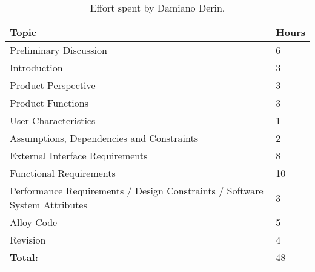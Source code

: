 \begin{table}[H]
    \centering
    \begin{tabular}{| m{} | m{} |}
        \hline
        \textbf{Topic}                                                             & \textbf{Hours} \\
        \hline
        Preliminary Discussion                                                     & 6              \\
        \hline
        Introduction                                                               & 3              \\
        \hline
        Product Perspective                                                        & 3              \\
        \hline
        Product Functions                                                          & 3              \\
        \hline
        User Characteristics                                                       & 1              \\
        \hline
        Assumptions, Dependencies and Constraints                                  & 2              \\
        \hline
        External Interface Requirements                                            & 8              \\
        \hline
        Functional Requirements                                                    & 10             \\
        \hline
        Performance Requirements / Design Constraints / Software System Attributes & 3              \\
        \hline
        Alloy Code                                                                 & 5              \\
        \hline
        Revision                                                                   & 4              \\
        \hline
        \hline
        \textbf{Total:}                                                            & 48             \\
        \hline
    \end{tabular}
    \caption{Effort spent by Damiano Derin.}
\end{table}